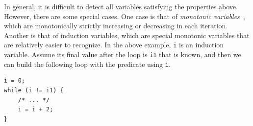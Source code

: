 \begin{itemize}
In general, it is difficult to detect all variables satisfying the properties above.
However, there are some special cases.
One case is that of \emph{monotonic variables}~\cite{Wolfe1992}, which are monotonically strictly increasing or decreasing in each iteration.
Another is that of induction variables, which are special monotonic variables that are relatively easier to recognize. In the above example, \texttt{i} is an induction variable. Assume its final value after the loop is \texttt{i1} that is known, and then we can build the following loop with the predicate using \texttt{i}.



\begin{lstlisting}
i = 0;
while (i != i1) {
    /* ... */
    i = i + 2;
}
\end{lstlisting}





\end{itemize}
